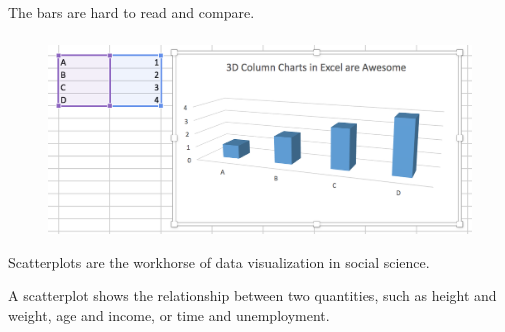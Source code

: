 \documentclass[11pt]{beamer}
\begin{document}
\begin{frame}
	
	\frametitle{\bfseries}
	\vspace{-1em}
	\\
		The bars are hard to read and compare.
\end{frame}

\begin{frame}
	
	\frametitle{\bfseries}
	\begin{figure}
		\vspace{-1em}
		\includegraphics[width=0.9\linewidth]{Figure/excel-3d-column-chart-values}
	\end{figure}
	\begin{itemize}
		\vspace{-1em}
		\footnotesize{
			\item Scatterplots are the workhorse of data visualization in social science.
			\item A scatterplot shows the relationship between two quantities, such as height and weight, age and income, or time and unemployment. }
	\end{itemize}
\end{frame}
\end{document}
